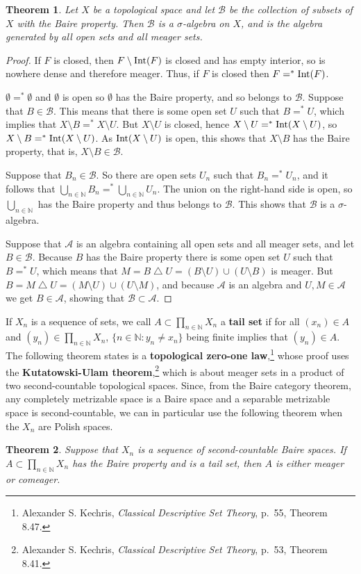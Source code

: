 \documentclass{article}
\newcommand{\Int}{\ensuremath\mathrm{Int}}
\newtheorem{theorem}{Theorem}
\theoremstyle{definition}
\begin{document}
\begin{theorem}
Let $X$ be a topological space and let $\mathscr{B}$ be the collection of subsets of $X$ with the Baire property. Then $\mathscr{B}$ is a $\sigma$-algebra
on $X$, and is the algebra generated by all open sets and all meager sets.
\end{theorem}
\begin{proof}
If $F$ is closed, then
$F \setminus \Int(F)$ is closed and has empty interior, so is nowhere dense and therefore meager. Thus,
if $F$ is closed then $F=^* \Int(F)$.

$\emptyset =^* \emptyset$ and  $\emptyset$ is open so $\emptyset$ has the Baire
property, and so belongs to $\mathscr{B}$. 
Suppose that $B \in \mathscr{B}$. This means that there is some open set $U$ such that $B=^* U$,
which implies that $X \setminus B =^* X \setminus U$. But $X \setminus U$ is closed, hence
$X \setminus U =^* \Int(X \setminus U)$, so $X \setminus B =^* \Int(X \setminus U)$. As
$\Int(X \setminus U)$ is open, this shows that $X \setminus B$ has the Baire property, that is, $X \setminus B \in \mathscr{B}$. 

Suppose that $B_n \in \mathscr{B}$. So there are open sets $U_n$ such that
$B_n =^* U_n$, and it follows that
$\bigcup_{n \in \mathbb{N}} B_n =^* \bigcup_{n \in \mathbb{N}} U_n$. The union on the right-hand side is open,
so $\bigcup_{n \in \mathbb{N}}$ has the Baire property and thus belongs to $\mathscr{B}$. This shows that $\mathscr{B}$
is a $\sigma$-algebra. 

Suppose that $\mathscr{A}$ is an algebra containing all open sets and all meager sets, and let
$B \in \mathscr{B}$. Because $B$ has the Baire property there is some open set $U$ such that
$B=^* U$, which means that $M=B \bigtriangleup U=(B\setminus U) \cup (U \setminus B)$ is meager. 
But $B = M \bigtriangleup U = (M \setminus U) \cup (U \setminus M)$, and because $\mathscr{A}$ is an algebra
and $U,M \in \mathscr{A}$ we get $B \in \mathscr{A}$, showing that $\mathscr{B} \subset \mathscr{A}$. 
\end{proof}



If $X_n$ is a sequence of sets, we call $A \subset \prod_{n \in \mathbb{N}} X_n$ a \textbf{tail set}
if for all $(x_n) \in A$ and $(y_n) \in \prod_{n \in \mathbb{N}} X_n$, $\{n \in \mathbb{N}: y_n \neq x_n\}$ 
being finite implies that $(y_n) \in A$. The following theorem states is a \textbf{topological zero-one law},\footnote{Alexander S. Kechris, {\em Classical Descriptive Set Theory}, p.~55, Theorem 8.47.} whose proof uses the \textbf{Kutatowski-Ulam theorem},\footnote{Alexander S. Kechris, {\em Classical Descriptive Set Theory}, p.~53, Theorem 8.41.} which is about
meager sets in a product of two second-countable topological spaces. Since, from the Baire category theorem, any completely metrizable space is a Baire space and
a separable metrizable space is second-countable,
we can in particular use the following theorem when the  $X_n$ are Polish spaces.

\begin{theorem}
Suppose that $X_n$ is a sequence of second-countable Baire spaces. If $A \subset \prod_{n \in \mathbb{N}} X_n$ has the Baire
property and is a tail set, then $A$ is either meager or comeager.
\end{theorem}
\end{document}
